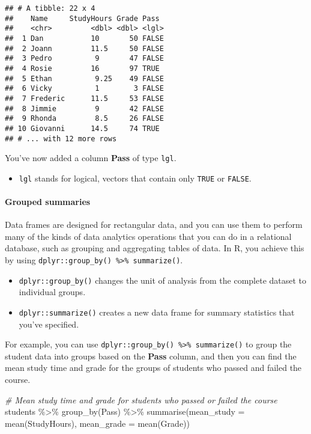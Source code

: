 \documentclass[
]{article}
\newenvironment{Shaded}{\begin{snugshade}}{\end{snugshade}}
\newcommand{\AttributeTok}[1]{\textcolor[rgb]{0.77,0.63,0.00}{#1}}
\newcommand{\CommentTok}[1]{\textcolor[rgb]{0.56,0.35,0.01}{\textit{#1}}}
\newcommand{\FunctionTok}[1]{\textcolor[rgb]{0.00,0.00,0.00}{#1}}
\newcommand{\NormalTok}[1]{#1}
\newcommand{\SpecialCharTok}[1]{\textcolor[rgb]{0.00,0.00,0.00}{#1}}
\providecommand{\tightlist}{%
  \setlength{\itemsep}{0pt}\setlength{\parskip}{0pt}}
\begin{document}
\begin{verbatim}
## # A tibble: 22 x 4
##    Name     StudyHours Grade Pass 
##    <chr>         <dbl> <dbl> <lgl>
##  1 Dan           10       50 FALSE
##  2 Joann         11.5     50 FALSE
##  3 Pedro          9       47 FALSE
##  4 Rosie         16       97 TRUE 
##  5 Ethan          9.25    49 FALSE
##  6 Vicky          1        3 FALSE
##  7 Frederic      11.5     53 FALSE
##  8 Jimmie         9       42 FALSE
##  9 Rhonda         8.5     26 FALSE
## 10 Giovanni      14.5     74 TRUE 
## # ... with 12 more rows
\end{verbatim}

You've now added a column \textbf{Pass} of type \texttt{lgl}.

\begin{itemize}
\tightlist
\item
  \texttt{lgl} stands for logical, vectors that contain only
  \texttt{TRUE} or \texttt{FALSE}.
\end{itemize}

\hypertarget{grouped-summaries}{%
\paragraph{Grouped summaries}\label{grouped-summaries}}

Data frames are designed for rectangular data, and you can use them to
perform many of the kinds of data analytics operations that you can do
in a relational database, such as grouping and aggregating tables of
data. In R, you achieve this by using
\texttt{dplyr::group\_by()\ \%\textgreater{}\%\ summarize()}.

\begin{itemize}
\item
  \texttt{dplyr::group\_by()} changes the unit of analysis from the
  complete dataset to individual groups.
\item
  \texttt{dplyr::summarize()} creates a new data frame for summary
  statistics that you've specified.
\end{itemize}

For example, you can use
\texttt{dplyr::group\_by()\ \%\textgreater{}\%\ summarize()} to group
the student data into groups based on the \textbf{Pass} column, and then
you can find the mean study time and grade for the groups of students
who passed and failed the course.

\begin{Shaded}
\begin{Highlighting}[]
\CommentTok{\# Mean study time and grade for students who passed or failed the course}
\NormalTok{students }\SpecialCharTok{\%\textgreater{}\%} 
  \FunctionTok{group\_by}\NormalTok{(Pass) }\SpecialCharTok{\%\textgreater{}\%} 
  \FunctionTok{summarise}\NormalTok{(}\AttributeTok{mean\_study =} \FunctionTok{mean}\NormalTok{(StudyHours), }\AttributeTok{mean\_grade =} \FunctionTok{mean}\NormalTok{(Grade))}
\end{Highlighting}
\end{Shaded}
\end{document}
